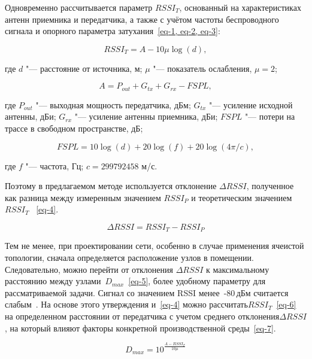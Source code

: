 Одновременно рассчитывается параметр $RSSI_T$, основанный на характеристиках антенн приемника и передатчика, а также с учётом частоты беспроводного сигнала и опорного параметра затухания~\cref{eq-1, eq-2, eq-3}:

\begin{equation}
	RSSI_T = A-10 \mu \log (d),
	\label{eq-1}
\end{equation}

\noindent где $d$ "--- расстояние от источника, м; $\mu$ "--- показатель ослабления, $\mu = 2$;

\begin{equation}
	A = P_{out} + G_{tx} + G_{rx} -FSPL,
	\label{eq-2}
\end{equation}

\noindent где $P_{out}$ "--- выходная мощность передатчика, дБм; $G_{tx}$ "--- усиление исходной антенны, дБи; $G_{rx}$ "--- усиление антенны приемника, дБи; $FSPL$ "--- потери на трассе в свободном пространстве, дБ;

\begin{equation}
	FSPL = 10 \log (d) +20 \log (f) +20 \log (4 \pi/c),
	\label{eq-3}
\end{equation}

\noindent где $f$ "--- частота, Гц; $c = 299792458$ м/с.

Поэтому в предлагаемом методе используется отклонение $\Delta RSSI$, полученное как разница между измеренным значением $RSSI_P$ и теоретическим значением $RSSI_T$~ \cref{eq-4}.

\begin{equation}
	\Delta RSSI = RSSI_T-RSSI_P
	\label{eq-4}
\end{equation}

Тем не менее, при проектировании сети, особенно в случае применения ячеистой топологии, сначала определяется расположение узлов в помещении. Следовательно, можно перейти от отклонения $\Delta RSSI$ к максимальному расстоянию между узлами~$D_{max}$~\cref{eq-5}, более удобному параметру для рассматриваемой задачи. Сигнал со значением RSSI менее~-80\,дБм считается слабым~\cite{mob_sig}. На основе этого утверждения и~\cref{eq-4} можно рассчитать$RSSI_T$~\cref{eq-6} на определенном расстоянии от передатчика с учетом среднего отклонения$\Delta RSSI$, на который влияют факторы конкретной производственной среды~\cref{eq-7}.

\begin{equation}
	D_{max} = 10^\frac{A-RSSI_T}{10 \mu}
	\label{eq-5}
\end{equation}

